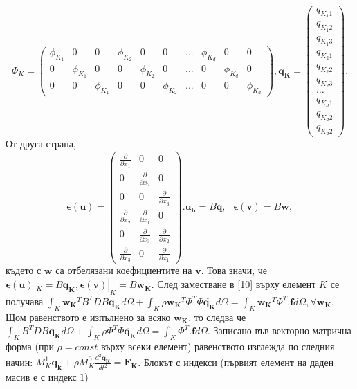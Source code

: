 \documentclass{report}
\begin{document}
	\[
	\Phi_K =
	\begin{pmatrix}
		\phi_{K_1} & 0 & 0 & \phi_{K_2} & 0 & 0 & ... & \phi_{K_d} & 0 & 0 \\
		0 & \phi_{K_1} & 0 & 0 & \phi_{K_2} & 0 & ... & 0 & \phi_{K_d} & 0 \\
		0 & 0 & \phi_{K_1} & 0 & 0 & \phi_{K_2} & ... & 0 & 0 & \phi_{K_d}
	\end{pmatrix}
	,\mathbf{q_K}=
	\begin{pmatrix}
		q_{{K_1}1}\\q_{{K_1}2}\\q_{{K_1}3}\\q_{{K_2}1}\\q_{{K_2}2}\\q_{{K_2}3}\\ \dots \\ q_{{K_d}1}\\q_{{K_d}2}\\q_{{K_d}2}
	\end{pmatrix}.
	\]
	От друга страна, 
	\[
	\boldsymbol{\epsilon}(\mathbf{u})=
	\begin{pmatrix}
		\frac{\partial}{\partial x_1} & 0 & 0\\
		0 & \frac{\partial}{\partial x_2} & 0\\
		0 & 0 & \frac{\partial}{\partial x_3}\\
		\frac{\partial}{\partial x_2} & \frac{\partial}{\partial x_1} & 0\\
		0 & \frac{\partial}{\partial x_3} & \frac{\partial}{\partial x_2}\\
		\frac{\partial}{\partial x_3} & 0 & \frac{\partial}{\partial x_1}
	\end{pmatrix}
	. \mathbf{u_h}=B\mathbf{q}, \text{ }
	\boldsymbol{\epsilon}(\mathbf{v})=B\mathbf{w},
	\]
	където с $\mathbf{w}$ са отбелязани коефициентите на $\mathbf{v}$. Това значи, че
	$
	\boldsymbol{\epsilon}(\mathbf{u})|_K=B\mathbf{q_K}, \boldsymbol{\epsilon}(\mathbf{v})|_K=B\mathbf{w_K}
	$.
	След заместване в \ref{10} върху елемент $K$ се получава 	$\displaystyle \int_K \mathbf{w_K}^TB^T DB\mathbf{q_K} d\Omega +\int_K \rho \mathbf{w_K}^T\Phi^T \Phi\mathbf{\ddot{q_K}}d\Omega =\int_K \mathbf{w_K}^T\Phi^T.\mathbf{f}d\Omega, \forall \mathbf{w_K}  $. Щом равенството е изпълнено за всяко $\mathbf{w_K}$, то следва че $\displaystyle \int_K B^T DB\mathbf{q_K} d\Omega +\int_K \rho \Phi^T \Phi\mathbf{\ddot{q_K}}d\Omega =\int_K \Phi^T.\mathbf{f}d\Omega$.
	Записано във векторно-матрична форма (при $\rho=const$ върху всеки елемент) равенството изглежда по следния начин: $\displaystyle M_K^1\mathbf{q_k}+\rho M_K^0\frac{d^2 \mathbf{q_K}}{dt^2}=\mathbf{F_K}$. Блокът с индекси (първият елемент на даден масив е с индекс $1$)
\end{document}
